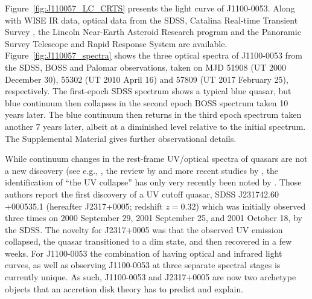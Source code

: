 \documentclass{nature}
\begin{document}
Figure~\ref{fig:J110057_LC_CRTS} presents the light curve of J1100-0053.  Along with WISE IR data, optical data from the SDSS, Catalina Real-time Transient Survey \citep[CRTS;][]{Drake2009, Mahabal2011}, the Lincoln Near-Earth Asteroid Research \citep[LINEAR; ][]{Sesar2011} program and the Panoramic Survey Telescope and Rapid Response System \citep[PanSTARRS;][]{Kaiser2010, Stubbs2010, Tonry2012, Magnier2013} are available. Figure~\ref{fig:J110057_spectra} shows the three optical spectra of J1100-0053 from the SDSS, BOSS and Palomar observations, taken on MJD 51908 (UT 2000 December 30), 55302 (UT 2010 April 16) and 57809 (UT 2017 February 25), respectively.  The first-epoch SDSS spectrum shows a typical blue quasar, but blue continuum then collapses in the second epoch BOSS spectrum taken 10 years later. The blue continuum then returns in the third epoch spectrum taken another 7 years later, albeit at a diminished level relative to the initial spectrum. The Supplemental Material gives further observational details.

While continuum changes in the rest-frame UV/optical spectra of quasars are not a new discovery (see e.g., \cite{Clavel1991}, the review by \cite{Ulrich1997} and more recent studies by \cite{VandenBerk2004, Pereyra2006, MacLeod2010, Guo2016b}, the identification of ``the UV collapse'' has only very recently been noted by \cite{Guo2016}.  Those authors report the first discovery of a UV cutoff quasar, SDSS J231742.60 +000535.1 (hereafter J2317+0005; redshift $z = 0.32$) which was initially observed three times on 2000 September 29, 2001 September 25, and 2001 October 18, by the SDSS. The novelty for J2317+0005 was that the observed UV emission collapsed, the quasar transitioned to a dim state, and then recovered in a few weeks. For  J1100-0053 the combination of having optical and infrared light curves, as well as observing J1100-0053 at three separate spectral stages is currently unique. As such,  J1100-0053 and J2317+0005 are now two archetype objects that an accretion disk theory has to predict and explain. 
\end{document}
